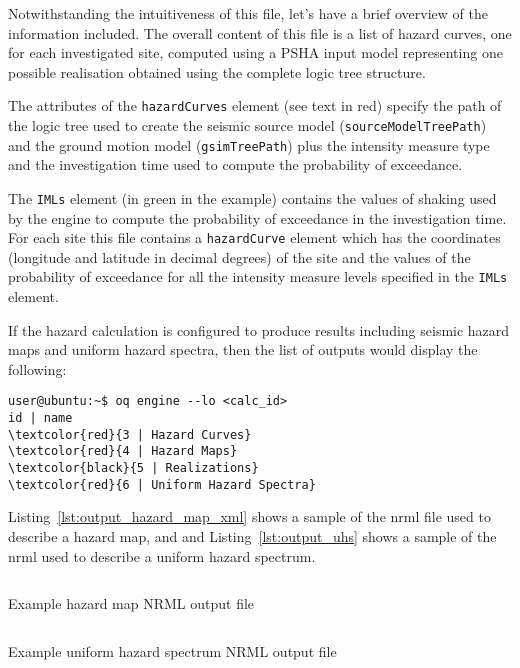 Notwithstanding the intuitiveness of this file, let's have a brief overview of
the information included. The overall content of this file is a list of hazard
curves, one for each investigated site, computed using a PSHA input model
representing one possible realisation obtained using the complete logic tree
structure.

The attributes of the \texttt{hazardCurves} element (see text in red) specify
the path of the logic tree used to create the seismic source model
(\texttt{source\-Model\-TreePath}) and the ground motion model
(\texttt{gsim\-Tree\-Path}) plus the intensity measure type and the
investigation time used to compute the probability of exceedance.

The \texttt{IMLs} element (in green in the example) contains the values of
shaking used by the engine to compute the probability of exceedance in the
investigation time. For each site this file contains a \texttt{hazardCurve}
element which has the coordinates (longitude and latitude in decimal degrees)
of the site and the values of the probability of exceedance for all the
intensity measure levels specified in the \texttt{IMLs} element.

If the hazard calculation is configured to produce results including seismic
hazard maps and uniform hazard spectra, then the list of outputs would display
the following:

\begin{Verbatim}[frame=single, commandchars=\\\{\}, fontsize=\small]
user@ubuntu:~$ oq engine --lo <calc_id>
id | name
\textcolor{red}{3 | Hazard Curves}
\textcolor{red}{4 | Hazard Maps}
\textcolor{black}{5 | Realizations}
\textcolor{red}{6 | Uniform Hazard Spectra}
\end{Verbatim}

Listing~\ref{lst:output_hazard_map_xml} shows a sample of the nrml file
used to describe a hazard map, and and Listing~\ref{lst:output_uhs}
shows a sample of the nrml used to describe a uniform hazard spectrum.

\begin{listing}[htbp]
  \inputminted[firstline=1,firstnumber=1,fontsize=\footnotesize,frame=single,linenos,bgcolor=lightgray]{xml}{oqum/hazard/verbatim/output_hazard_map.xml}
  \caption{Example hazard map NRML output file}
  \label{lst:output_hazard_map_xml}
\end{listing}


\begin{listing}[htbp]
  \inputminted[firstline=1,firstnumber=1,fontsize=\footnotesize,frame=single,linenos,bgcolor=lightgray]{xml}{oqum/hazard/verbatim/output_uhs.xml}
  \caption{Example uniform hazard spectrum NRML output file}
  \label{lst:output_uhs}
\end{listing}